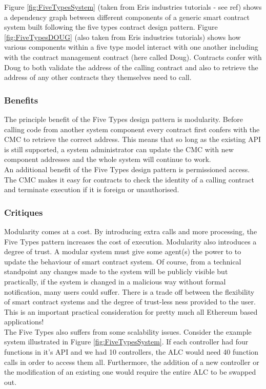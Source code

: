 Figure \ref{fig:FiveTypesSystem} (taken from Eris industries tutorials - see ref) shows a dependency graph between different components of a generic smart contract system built following the five types contract design pattern. Figure \ref{fig:FiveTypesDOUG} (also taken from Eris industries tutorials) shows how various components within a five type model interact with one another including with the contract management contract (here called Doug). Contracts confer with Doug to both validate the address of the calling contract and also to retrieve the address of any other contracts they themselves need to call.

\subsubsection{Benefits}
The principle benefit of the Five Types design pattern is modularity. Before calling code from another system component every contract first confers with the CMC to retrieve the correct address. This means that so long as the existing API is still supported, a system administrator can update the CMC with new component addresses and the whole system will continue to work.\\

An additional benefit of the Five Types design pattern is permissioned access. The CMC makes it easy for contracts to check the identity of a calling contract and terminate execution if it is foreign or unauthorised. \\


\subsubsection{Critiques}
Modularity comes at a cost. By introducing extra calls and more processing, the Five Types pattern increases the cost of execution. Modularity also introduces a degree of trust. A modular system must give some agent(s) the power to to update the behaviour of smart contract system. Of course, from a technical standpoint any changes made to the system will be publicly visible but practically, if the system is changed in a malicious way without formal notification, many users could suffer. There is a trade off between the flexibility of smart contract systems and the degree of trust-less ness provided to the user. This is an important practical consideration for pretty much all Ethereum based applications! \\

The Five Types also suffers from some scalability issues. Consider the example system illustrated in Figure \ref{fig:FiveTypesSystem}. If each controller had four functions in it's API and we had 10 controllers, the ALC would need 40 function calls in order to access them all. Furthermore, the addition of a new controller or the modification of an existing one would require the entire ALC to be swapped out. \\


